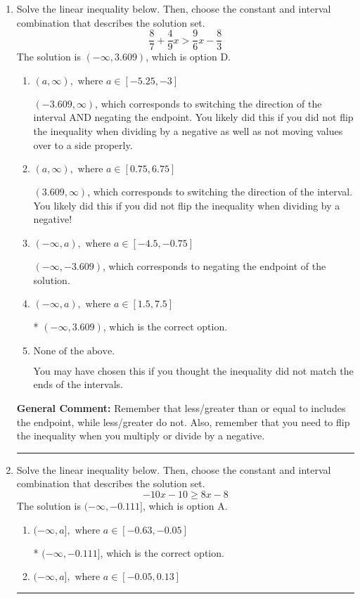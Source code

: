 \documentclass{extbook}[14pt]
\newcommand{\litem}[1]{\item #1

\rule{\textwidth}{0.4pt}}
\begin{document}
\begin{enumerate}\litem{
Solve the linear inequality below. Then, choose the constant and interval combination that describes the solution set.
\[ \frac{8}{7} + \frac{4}{9} x > \frac{9}{6} x - \frac{8}{3} \]The solution is \( (-\infty, 3.609) \), which is option D.\begin{enumerate}[label=\Alph*.]
\item \( (a, \infty), \text{ where } a \in [-5.25, -3] \)

 $(-3.609, \infty)$, which corresponds to switching the direction of the interval AND negating the endpoint. You likely did this if you did not flip the inequality when dividing by a negative as well as not moving values over to a side properly.
\item \( (a, \infty), \text{ where } a \in [0.75, 6.75] \)

 $(3.609, \infty)$, which corresponds to switching the direction of the interval. You likely did this if you did not flip the inequality when dividing by a negative!
\item \( (-\infty, a), \text{ where } a \in [-4.5, -0.75] \)

 $(-\infty, -3.609)$, which corresponds to negating the endpoint of the solution.
\item \( (-\infty, a), \text{ where } a \in [1.5, 7.5] \)

* $(-\infty, 3.609)$, which is the correct option.
\item \( \text{None of the above}. \)

You may have chosen this if you thought the inequality did not match the ends of the intervals.
\end{enumerate}

\textbf{General Comment:} Remember that less/greater than or equal to includes the endpoint, while less/greater do not. Also, remember that you need to flip the inequality when you multiply or divide by a negative.
}
\litem{
Solve the linear inequality below. Then, choose the constant and interval combination that describes the solution set.
\[ -10x -10 \geq 8x -8 \]The solution is \( (-\infty, -0.111] \), which is option A.\begin{enumerate}[label=\Alph*.]
\item \( (-\infty, a], \text{ where } a \in [-0.63, -0.05] \)

* $(-\infty, -0.111]$, which is the correct option.
\item \( (-\infty, a], \text{ where } a \in [-0.05, 0.13] \)


\end{enumerate}}
\end{enumerate}
\end{document}
